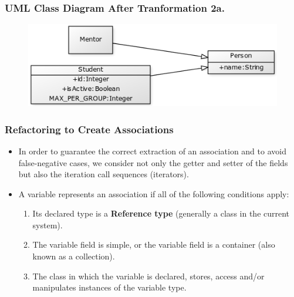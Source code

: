 \documentclass[xcolor=table]{beamer}
\begin{document}
\begin{frame}
\frametitle{UML Class Diagram After Tranformation 2a.}
\begin{figure}
\includegraphics[width=0.99\linewidth]{Figures/uml2.png}
\end{figure}
\end{frame}


\begin{frame}[fragile] %
\frametitle{Refactoring to Create Associations}
\begin{itemize}
  \item In order to guarantee the correct extraction of an association and to avoid false-negative cases, we consider not only the getter and setter of the fields but also the iteration call sequences (iterators). 
  \item A variable represents an association if all of the following conditions apply:
\begin{enumerate}
  \item Its declared type is a \textbf{ Reference type} (generally a class in the current system).
  \item The variable field is simple, or the variable field is a container (also known as a collection).
  \item The class in which the variable is declared, stores, access and/or manipulates instances of the variable type.
\end{enumerate}
\end{itemize}

\end{frame}
\end{document}
